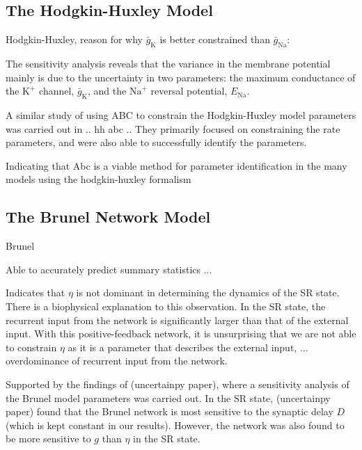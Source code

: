\subsection{The Hodgkin-Huxley Model}

Hodgkin-Huxley, reason for why $\bar{g}_\mathrm{K}$ is better constrained than $\bar{g}_\mathrm{Na}$:

The sensitivity analysis reveals that the variance in the membrane potential mainly is due to the uncertainty in two parameters: the maximum conductance of the $\mathrm{K}^+$ channel, $\bar{g}_\mathrm{K}$, and the $\mathrm{Na}^+$ reversal potential, $E_\mathrm{Na}$.

A similar study of using ABC to constrain the Hodgkin-Huxley model parameters was carried out in .. hh abc .. They primarily focused on constraining the rate parameters, and were also able to successfully identify the parameters.  

Indicating that Abc is a viable method for parameter identification in the many models using the hodgkin-huxley formalism

\subsection{The Brunel Network Model}

Brunel 

Able to accurately predict summary statistics ...


Indicates that $\eta$ is not dominant in determining the dynamics of the SR state. There is a biophysical explanation to this observation. In the SR state, the recurrent input from the network is significantly larger than that of the external input. With this positive-feedback network, it is unsurprising that we are not able to constrain $\eta$ as it is a parameter that describes the external input, ... overdominance of recurrent input from the network. 

Supported by the findings of (uncertainpy paper), where a sensitivity analysis of the Brunel model parameters was carried out. In the SR state, (uncertainpy paper) found that the Brunel network is most sensitive to the synaptic delay $D$ (which is kept constant in our results). However, the network was also found to be more sensitive to $g$ than $\eta$ in the SR state. 

